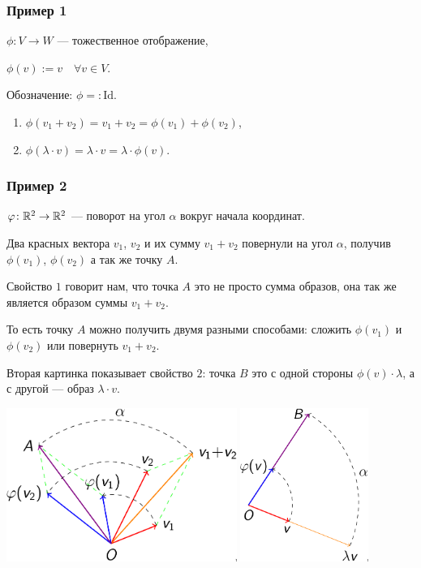 \subsubsection{Пример 1}

$\phi\colon V \to W$ --- тожественное отображение,

$\phi(v) := v \quad \forall v \in V$.

Обозначение: $\phi =: \text{Id}$.

\bigskip
\begin{enumerate}[label=\arabic*), nosep]
\item $\phi(v_1 + v_2) = v_1 + v_2 = \phi(v_1) + \phi(v_2)$,
\item $\phi(\lambda \cdot v) = \lambda \cdot v = \lambda \cdot \phi(v)$.
\end{enumerate}

\subsubsection{Пример 2}

$\varphi\colon \mathbb{R}^2 \to \mathbb{R}^2$ --- поворот на угол $\alpha$ вокруг начала координат. 

\bigskip
Два красных вектора $v_1$, $v_2$ и их сумму $v_1 + v_2$ повернули на угол $\alpha$, получив $\phi(v_1)$, $\phi(v_2)$ а так же точку $A$.

Свойство $1$ говорит нам, что точка $A$ это не просто сумма образов, она так же является образом суммы $v_1 + v_2$.

То есть точку $A$ можно получить двумя разными способами: сложить $\phi(v_1)$ и $\phi(v_2)$ или повернуть $v_1 + v_2$.

\bigskip
Вторая картинка показывает свойство $2$: точка $B$ это с одной стороны $\phi(v) \cdot \lambda$, а с другой --- образ $\lambda \cdot v$. 

\begin{center}
    \includegraphics[height=5cm]{lecture16_example2_1}
    \hspace{2cm}
    \includegraphics[height=5cm]{lecture16_example2_2}
\end{center}

